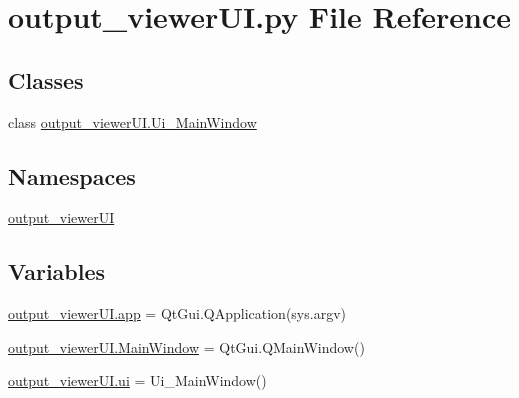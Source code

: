 \hypertarget{a00026}{}\section{output\+\_\+viewer\+U\+I.\+py File Reference}
\label{a00026}
\subsection*{Classes}
\begin{DoxyCompactItemize}
\item 
class \hyperlink{a00098}{output\+\_\+viewer\+U\+I.\+Ui\+\_\+\+Main\+Window}
\end{DoxyCompactItemize}
\subsection*{Namespaces}
\begin{DoxyCompactItemize}
\item 
 \hyperlink{a00057}{output\+\_\+viewer\+UI}
\end{DoxyCompactItemize}
\subsection*{Variables}
\begin{DoxyCompactItemize}
\item 
\hyperlink{a00057_a2c3ab398f8123bd6d034a961fc6a4368}{output\+\_\+viewer\+U\+I.\+app} = Qt\+Gui.\+Q\+Application(sys.\+argv)
\item 
\hyperlink{a00057_a95763e93bffcc3d9bda7ae977c5c2c4e}{output\+\_\+viewer\+U\+I.\+Main\+Window} = Qt\+Gui.\+Q\+Main\+Window()
\item 
\hyperlink{a00057_a86154c987d338cba4f5269407ad97f69}{output\+\_\+viewer\+U\+I.\+ui} = Ui\+\_\+\+Main\+Window()
\end{DoxyCompactItemize}
